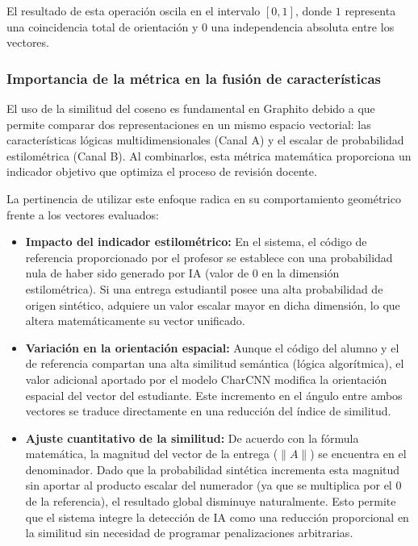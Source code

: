 El resultado de esta operación oscila en el intervalo $[0, 1]$, donde $1$ representa una coincidencia total de orientación y $0$ una independencia absoluta entre los vectores.

\subsubsection{Importancia de la métrica en la fusión de características}

El uso de la similitud del coseno es fundamental en Graphito debido a que permite comparar dos representaciones en un mismo espacio vectorial: las características lógicas multidimensionales (Canal A) y el escalar de probabilidad estilométrica (Canal B). Al combinarlos, esta métrica matemática proporciona un indicador objetivo que optimiza el proceso de revisión docente.

La pertinencia de utilizar este enfoque radica en su comportamiento geométrico frente a los vectores evaluados:

\begin{itemize}
	\item \textbf{Impacto del indicador estilométrico:} En el sistema, el código de referencia proporcionado por el profesor se establece con una probabilidad nula de haber sido generado por IA (valor de $0$ en la dimensión estilométrica). Si una entrega estudiantil posee una alta probabilidad de origen sintético, adquiere un valor escalar mayor en dicha dimensión, lo que altera matemáticamente su vector unificado.
	\item \textbf{Variación en la orientación espacial:} Aunque el código del alumno y el de referencia compartan una alta similitud semántica (lógica algorítmica), el valor adicional aportado por el modelo CharCNN modifica la orientación espacial del vector del estudiante. Este incremento en el ángulo entre ambos vectores se traduce directamente en una reducción del índice de similitud.
	\item \textbf{Ajuste cuantitativo de la similitud:} De acuerdo con la fórmula matemática, la magnitud del vector de la entrega ($\|A\|$) se encuentra en el denominador. Dado que la probabilidad sintética incrementa esta magnitud sin aportar al producto escalar del numerador (ya que se multiplica por el $0$ de la referencia), el resultado global disminuye naturalmente. Esto permite que el sistema integre la detección de IA como una reducción proporcional en la similitud sin necesidad de programar penalizaciones arbitrarias.
\end{itemize}

